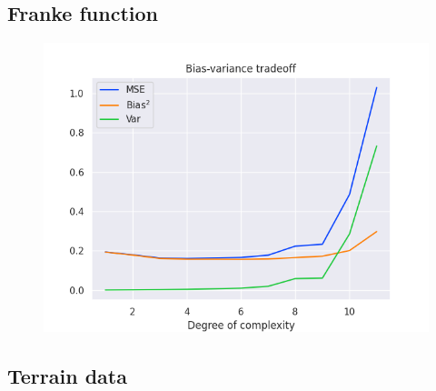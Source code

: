 \subsection{Franke function}

\begin{figure}[h!]
\centering
\includegraphics[width=1\linewidth]{project_1/figures/bias_var_bootstrap.png}\label{plot_overfit}
\caption{}
\end{figure}


\subsection{Terrain data}

